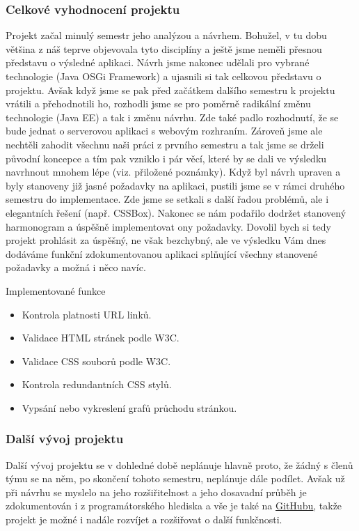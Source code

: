 \documentclass{beamer}
\begin{document}
\begin{frame}[allowframebreaks]\frametitle{Celkové vyhodnocení projektu}

	Projekt začal minulý semestr jeho analýzou a návrhem. Bohužel, v tu dobu většina z náš teprve objevovala tyto disciplíny a ještě jsme neměli přesnou představu o výsledné aplikaci. Návrh jsme nakonec udělali pro vybrané technologie (Java OSGi Framework) a ujasnili si tak celkovou představu o projektu. Avšak když jsme se pak před začátkem dalšího semestru k projektu vrátili a přehodnotili ho, rozhodli jsme se pro poměrně radikální změnu technologie (Java EE) a tak i změnu návrhu. Zde také padlo rozhodnutí, že se bude jednat o serverovou aplikaci s webovým rozhraním. Zároveň jsme ale nechtěli zahodit všechnu naši práci z prvního semestru a tak jsme se drželi původní koncepce a tím pak vzniklo i pár věcí, které by se dali ve výsledku navrhnout mnohem lépe (viz. přiložené poznámky). Když byl návrh upraven a byly stanoveny již jasné požadavky na aplikaci, pustili jsme se v rámci druhého semestru do implementace. Zde jsme se setkali s další řadou problémů, ale i elegantních řešení (např. CSSBox). Nakonec se nám podařilo dodržet stanovený harmonogram a úspěšně implementovat ony požadavky. Dovolil bych si tedy projekt prohlásit za úspěšný, ne však bezchybný, ale ve výsledku Vám dnes dodáváme funkční zdokumentovanou aplikaci splňující všechny stanovené požadavky a možná i něco navíc.
	
		\begin{block}{Implementované funkce}
			\begin{itemize}
				\item Kontrola platnosti URL linků.
				\item Validace HTML stránek podle W3C.
				\item Validace CSS souborů podle W3C.
				\item Kontrola redundantních CSS stylů.
				\item Vypsání nebo vykreslení grafů průchodu stránkou.
			\end{itemize}
		\end{block}
   
\end{frame}

\begin{frame}[allowframebreaks]\frametitle{Další vývoj projektu}
		
	Další vývoj projektu se v dohledné době neplánuje hlavně proto, že žádný s členů týmu se na něm, po skončení tohoto semestru, neplánuje dále podílet. Avšak už při návrhu se myslelo na jeho rozšiřitelnost a jeho dosavadní průběh je zdokumentován i z programátorského hlediska a vše je také na \href{https://github.com/kozajaku/www-presentations-checker}{\underline{GitHubu}}, takže projekt je možné i nadále rozvíjet a rozšiřovat o další funkčnosti.
		
\end{frame}
\end{document}
